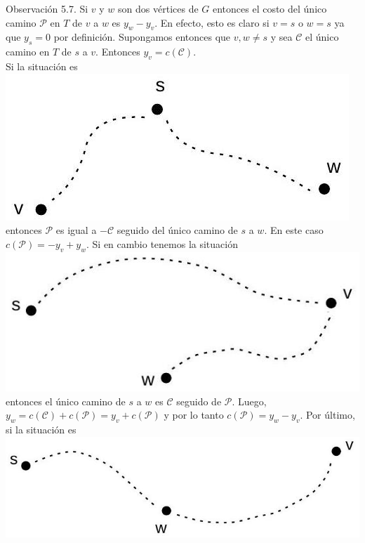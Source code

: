 \documentclass[10pt]{article}
\begin{document}
Observación 5.7. Si $v$ y $w$ son dos vértices de $G$ entonces el costo del único camino $\mathcal{P}$ en $T$ de $v$ a $w$ es $y_{w}-y_{v}$. En efecto, esto es claro si $v=s$ o $w=s$ ya que $y_{s}=0$ por definición. Supongamos entonces que $v, w \neq s$ y sea $\mathcal{C}$ el único camino en $T$ de $s$ a $v$. Entonces $y_{v}=c(\mathcal{C})$.\\
Si la situación es\\
\includegraphics[max width=\textwidth, center]{2025_09_05_955b52bfc43174a24a9ag-22}\\
entonces $\mathcal{P}$ es igual a $-\mathcal{C}$ seguido del único camino de $s$ a $w$. En este caso $c(\mathcal{P})=-y_{v}+y_{w}$. Si en cambio tenemos la situación\\
\includegraphics[max width=\textwidth, center]{2025_09_05_955b52bfc43174a24a9ag-23}\\
entonces el único camino de $s$ a $w$ es $\mathcal{C}$ seguido de $\mathcal{P}$. Luego, $y_{w}=c(\mathcal{C})+c(\mathcal{P})=y_{v}+c(\mathcal{P})$ y por lo tanto $c(\mathcal{P})=y_{w}-y_{v}$. Por último, si la situación es\\
\includegraphics[max width=\textwidth, center]{2025_09_05_955b52bfc43174a24a9ag-23(2)}\\
\end{document}
